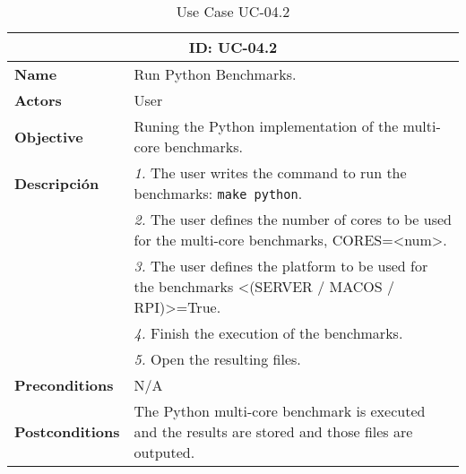 \begin{table}[H]
    \centering
    \begin{tabular}{l p{10cm}}
        \toprule
        \multicolumn{2}{c}{\textbf{ID: UC-04.2}} \\
        \toprule
        \textbf{Name}                         &  Run Python Benchmarks. \\
        \textbf{Actors}                       &  User \\
        \textbf{Objective}                    &  Runing the Python implementation of the multi-core benchmarks. \\
        \multirow{1}{*}{\textbf{Descripción}} & \textsl{1.} The user writes the command to run the benchmarks: \texttt{make python}.\\
                                              & \textsl{2.} The user defines the number of cores to be used for the multi-core benchmarks, CORES=<num>.\\
                                              & \textsl{3.} The user defines the platform to be used for the benchmarks <(SERVER / MACOS / RPI)>=True.\\
                                              & \textsl{4.} Finish the execution of the benchmarks.\\
                                              & \textsl{5.} Open the resulting files.\\ 
        \textbf{Preconditions}                &  N/A \\
        \textbf{Postconditions}               &  The Python multi-core benchmark is executed and the results are stored and those files are outputed. \\
    \end{tabular}
    \caption{Use Case UC-04.2}
    \label{tab:uc-04.2}
\end{table}


